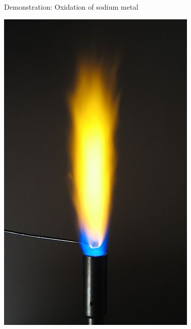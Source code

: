 {{\begin{g_experiment}{Demonstration: Oxidation of sodium metal}
\begin{minipage}{.4\textwidth}
 \begin{center}
  \includegraphics[width=.5\textwidth]{photos/sodium_flame_soren_wedel_nielsen_wikipedia.jpg}
 \end{center}

\end{minipage}


\end{g_experiment}}}
